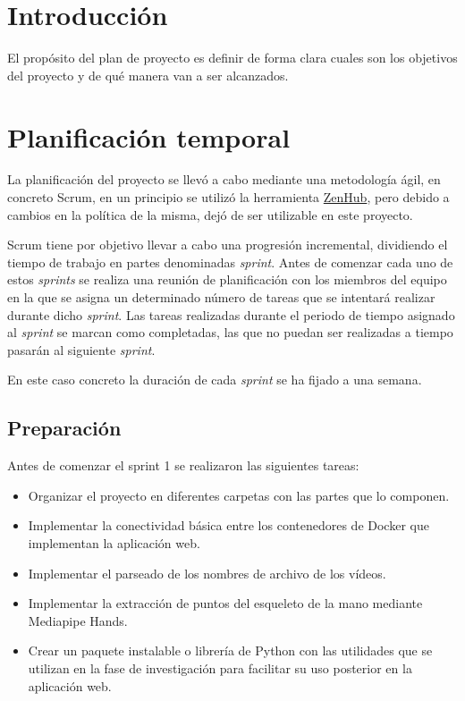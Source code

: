 \label{cha:Plan de Proyecto Software}

\section{Introducción}

El propósito del plan de proyecto es definir de forma clara cuales son los
objetivos del proyecto y de qué manera van a ser alcanzados.

\section{Planificación temporal}

La planificación del proyecto se llevó a cabo mediante una metodología ágil, en
concreto Scrum, en un principio se utilizó la herramienta
\href{https://www.zenhub.com/}{ZenHub}, pero debido a cambios en la política de
la misma, dejó de ser utilizable en este proyecto.

Scrum tiene por objetivo llevar a cabo una progresión incremental, dividiendo el
tiempo de trabajo en partes denominadas \textit{sprint}. Antes de comenzar cada
uno de estos \textit{sprints} se realiza una reunión de planificación con los
miembros del equipo en la que se asigna un determinado número de tareas que se
intentará realizar durante dicho \textit{sprint}. Las tareas realizadas durante
el periodo de tiempo asignado al \textit{sprint} se marcan como completadas, las
que no puedan ser realizadas a tiempo pasarán al siguiente \textit{sprint}.

En este caso concreto la duración de cada \textit{sprint} se ha fijado a una
semana.

\subsection{Preparación}

Antes de comenzar el sprint 1 se realizaron las siguientes tareas:

\begin{itemize}
    \item Organizar el proyecto en diferentes carpetas con las partes que lo
          componen.
    \item Implementar la conectividad básica entre los contenedores de Docker
          que implementan la aplicación web.
    \item Implementar el parseado de los nombres de archivo de los vídeos.
    \item Implementar la extracción de puntos del esqueleto de la mano mediante
          Mediapipe Hands.
    \item Crear un paquete instalable o librería de Python con las utilidades
          que se utilizan en la fase de investigación para facilitar su uso
          posterior en la aplicación web.
\end{itemize}

